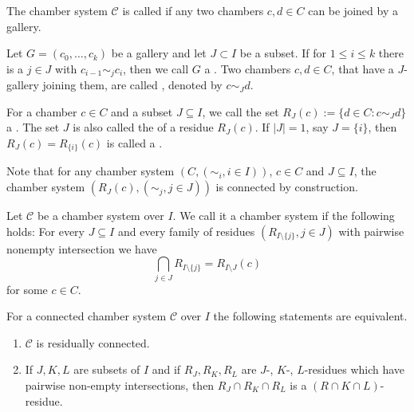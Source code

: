 \begin{defi}
	The chamber system $\mathcal{C}$ is called  if any two chambers $c,d \in C$ can be joined by a gallery.
\end{defi}

\begin{defi}
	Let $G = (c_0,\ldots,c_k)$ be a gallery and let $J \subset I$ be a subset. If for $1 \leq i \leq k$ there is a $j \in J$ with $c_{i-1} \sim_j c_i$, then we call $G$ a . Two chambers $c,d \in C$, that have a $J$-gallery joining them, are called , denoted by $c \sim_J d$.
\end{defi}

\begin{defi}
	For a chamber $c \in C$ and a subset $J \subseteq I$, we call the set $R_J(c) := \{ d \in C : c \sim_J d \}$ a . The set $J$ is also called the  of a residue $R_J(c)$. If $|J| = 1$, say $J = \{i\}$, then $R_J(c) = R_{\{i\}}(c)$ is called a .
\end{defi}

Note that for any chamber system $(C,(\sim_i, i \in I))$, $c \in C$ and $J \subseteq I$, the chamber system $(R_J(c), (\sim_j, j \in J))$ is connected by construction.

\begin{defi}
	Let $\mathcal{C}$ be a chamber system over $I$. We call it a  chamber system if the following holds: For every $J \subseteq I$ and every family of residues $(R_{I \setminus \{j\}}, j \in J)$ with pairwise nonempty intersection we have
	$$ \bigcap_{j \in J} R_{I \setminus \{j\}} = R_{I \setminus J}(c) $$
	for some $c \in C$.
\end{defi}

\begin{lemm}
	For a connected chamber system $\mathcal{C}$ over $I$ the following statements are equivalent.
	\begin{enumerate}
		\item $\mathcal{C}$ is residually connected.
		\item If $J,K,L$ are subsets of $I$ and if $R_J, R_K, R_L$ are $J$-, $K$-, $L$-residues which have pairwise non-empty intersections, then $R_J \cap R_K \cap R_L$ is a $(R \cap K \cap L)$-residue.
	\end{enumerate}
\end{lemm}